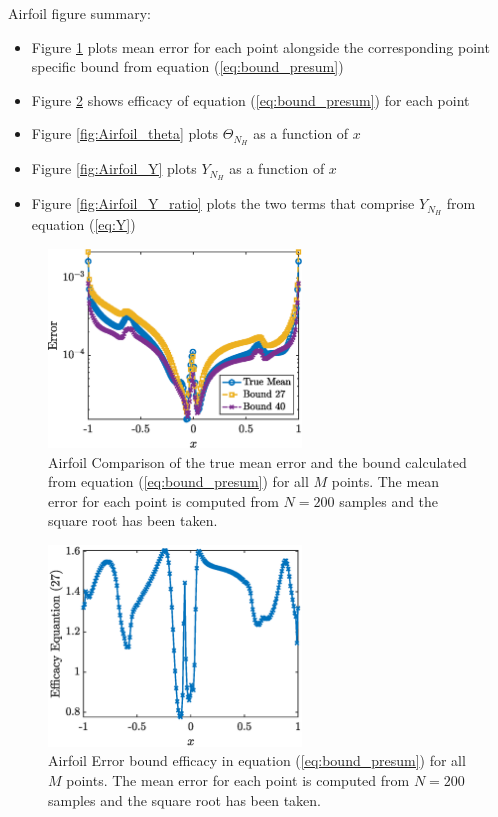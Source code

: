 \documentclass{report}
\begin{document}
Airfoil figure summary: 
\begin{itemize}
\item Figure \ref{fig:Airfoil_eq_27_bound} plots mean error for each point alongside the corresponding point specific bound from equation (\ref{eq:bound_presum}) 
\item Figure \ref{fig:Airfoil_eq_27_efficacy} shows efficacy of equation (\ref{eq:bound_presum}) for each point
\item Figure \ref{fig:Airfoil_theta} plots $\Theta_{N_H}$ as a function of $x$
\item Figure \ref{fig:Airfoil_Y} plots $Y_{N_H}$ as a function of $x$
\item Figure \ref{fig:Airfoil_Y_ratio} plots the two terms that comprise $Y_{N_H}$ from equation (\ref{eq:Y})
\end{itemize}

% 
\begin{figure}[ht!]
\centering
\includegraphics[width =0.6\textwidth]{Figures/Airfoil_eq_27_bound.eps}
\caption{Airfoil Comparison of the true mean error and the bound calculated from equation (\ref{eq:bound_presum}) for all $M$ points. The mean error for each point is computed from $N=200$ samples and the square root has been taken.} 
\label{fig:Airfoil_eq_27_bound}
\end{figure}
%

\begin{figure}[ht!]
\centering
\includegraphics[width =0.6\textwidth]{Figures/Airfoil_eq_27_efficacy.eps}
\caption{Airfoil Error bound efficacy in equation (\ref{eq:bound_presum}) for all $M$ points. The mean error for each point is computed from $N=200$ samples and the square root has been taken.} 
\label{fig:Airfoil_eq_27_efficacy}
\end{figure}
%
\end{document}
